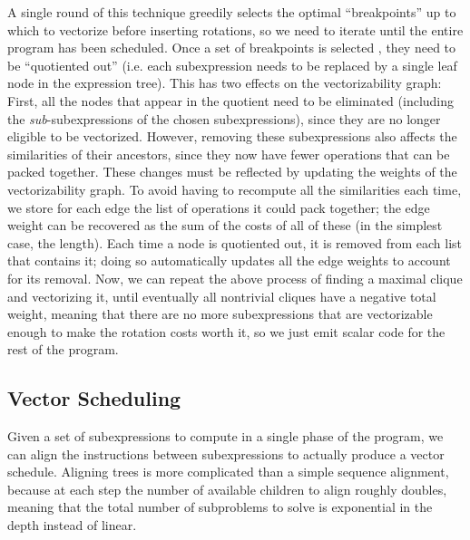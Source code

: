 A single round of this technique greedily selects the optimal ``breakpoints'' up to which to vectorize before inserting rotations, so we need to iterate until the entire program has been scheduled.
Once a set of breakpoints is selected , they need to be ``quotiented out'' (i.e. each subexpression needs to be replaced by a single leaf node in the expression tree).
This has two effects on the vectorizability graph: First, all the nodes that appear in the quotient need to be eliminated (including the {\em sub}-subexpressions of the chosen subexpressions), since they are no longer eligible to be vectorized.
However, removing these subexpressions also affects the similarities of their ancestors, since they now have fewer operations that can be packed together.
These changes must be reflected by updating the weights of the vectorizability graph.
To avoid having to recompute all the similarities each time, we store for each edge the list of operations it could pack together; the edge weight can be recovered as the sum of the costs of all of these (in the simplest case, the length).
Each time a node is quotiented out, it is removed from each list that contains it; doing so automatically updates all the edge weights to account for its removal.
Now, we can repeat the above process of finding a maximal clique and vectorizing it, until eventually all nontrivial cliques have a negative total weight, meaning that there are no more subexpressions that are vectorizable enough to make the rotation costs worth it, so we just emit scalar code for the rest of the program.

\subsection{Vector Scheduling}
Given a set of subexpressions to compute in a single phase of the program, we can align the instructions between subexpressions to actually produce a vector schedule.
Aligning trees is more complicated than a simple sequence alignment, because at each step the number of available children to align roughly doubles, meaning that the total number of subproblems to solve is exponential in the depth instead of linear. 

